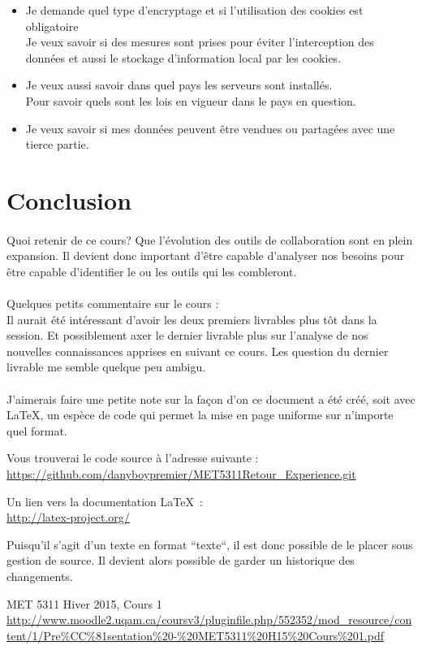 \documentclass[12pt]{article}
\begin{document}
\begin{itemize}
    \item Je demande quel type d'encryptage et si l'utilisation des cookies est obligatoire\\
Je veux savoir si des mesures sont prises pour éviter l'interception des données et aussi le stockage d'information local par les cookies.
    \item Je veux aussi savoir dans quel pays les serveurs sont installés.\\
Pour savoir quels sont les lois en vigueur dans le pays en question.
    \item Je veux savoir si mes données peuvent être vendues ou partagées avec une tierce partie.
\end{itemize}

\newpage
\section{Conclusion}
\hrulefill
\paragraph{}
Quoi retenir de ce cours? Que l'évolution des outils de collaboration sont en plein expansion. Il devient donc important d'être capable d'analyser nos besoins pour être capable d'identifier le ou les outils qui les combleront.

\paragraph{}
Quelques petits commentaire sur le cours :\\
Il aurait été intéressant d'avoir les deux premiers livrables plus tôt dans la session. Et possiblement axer le dernier livrable plus sur l'analyse de nos nouvelles connaissances apprises en suivant ce cours. Les question du dernier livrable me semble quelque peu ambigu.

\paragraph{}
J'aimerais faire une petite note sur la façon d'on ce document a été créé, soit avec \LaTeX, un espèce de code qui permet la mise en page uniforme sur n'importe quel format.

Vous trouverai le code source à l'adresse suivante :\\
\url{https://github.com/danyboypremier/MET5311Retour_Experience.git}

Un lien vers la documentation \LaTeX\ :\\
\url{http://latex-project.org/}

Puisqu'il s'agit d'un texte en format ``texte``, il est donc possible de le placer sous gestion de source. Il devient alors possible de garder un historique des changements.
\newpage

\begin{thebibliography}{99}
 MET 5311 Hiver 2015, Cours 1\\
    \url{http://www.moodle2.uqam.ca/coursv3/pluginfile.php/552352/mod_resource/content/1/Pre%CC%81sentation%20-%20MET5311%20H15%20Cours%201.pdf}
\end{thebibliography}
\end{document}
